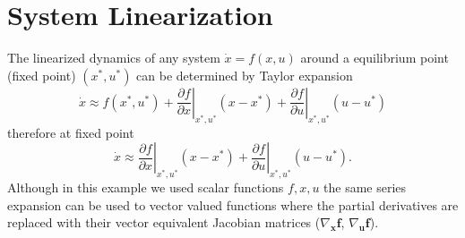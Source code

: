 \documentclass[superscriptaddress,floatfix,reprint,amssymb, amsmath,aps, pre]{revtex4-1}
\begin{document}
{    \section{System Linearization}{
        The linearized dynamics of any system \(\dot x = f(x,u)\) around a equilibrium point (fixed point) \((x^*,u^*)\) can be determined by Taylor expansion 
        \begin{equation*}
            \dot x \approx f(x^*,u^*) + \left.\frac{\partial f}{\partial x}\right|_{x^*,u^*} (x - x^*) + \left.\frac{\partial f}{\partial u}\right|_{x^*,u^*} (u - u^*)
        \end{equation*}
        therefore at fixed point 
        \begin{equation*}
            \dot x \approx  \left.\frac{\partial f}{\partial x}\right|_{x^*,u^*} (x - x^*) + \left.\frac{\partial f}{\partial u}\right|_{x^*,u^*} (u - u^*).
        \end{equation*}
        Although in this example we used scalar functions \(f,x,u\) the same series expansion can be used to vector valued functions where the partial derivatives are replaced with their vector equivalent Jacobian matrices (\(\nabla_{\mathbf{x}} \mathbf{f}\), \(\nabla_{\mathbf{u}} \mathbf{f}\)). 
        
}}
\end{document}
